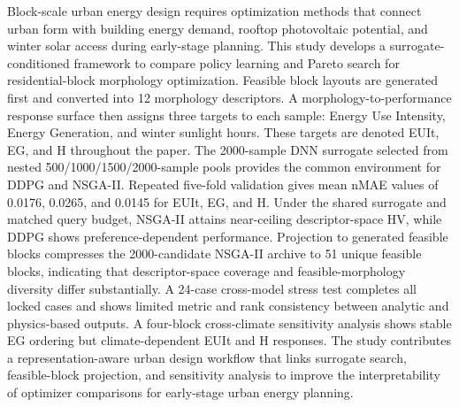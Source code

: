 \documentclass[10pt]{article}
\begin{document}
\begin{revisionbox}
Block-scale urban energy design requires optimization methods that connect urban form with building energy demand, rooftop photovoltaic potential, and winter solar access during early-stage planning. This study develops a surrogate-conditioned framework to compare policy learning and Pareto search for residential-block morphology optimization. Feasible block layouts are generated first and converted into 12 morphology descriptors. A morphology-to-performance response surface then assigns three targets to each sample: Energy Use Intensity, Energy Generation, and winter sunlight hours. These targets are denoted EUIt, EG, and H throughout the paper. The 2000-sample DNN surrogate selected from nested 500/1000/1500/2000-sample pools provides the common environment for DDPG and NSGA-II. Repeated five-fold validation gives mean nMAE values of 0.0176, 0.0265, and 0.0145 for EUIt, EG, and H. Under the shared surrogate and matched query budget, NSGA-II attains near-ceiling descriptor-space HV, while DDPG shows preference-dependent performance. Projection to generated feasible blocks compresses the 2000-candidate NSGA-II archive to 51 unique feasible blocks, indicating that descriptor-space coverage and feasible-morphology diversity differ substantially. A 24-case cross-model stress test completes all locked cases and shows limited metric and rank consistency between analytic and physics-based outputs. A four-block cross-climate sensitivity analysis shows stable EG ordering but climate-dependent EUIt and H responses. The study contributes a representation-aware urban design workflow that links surrogate search, feasible-block projection, and sensitivity analysis to improve the interpretability of optimizer comparisons for early-stage urban energy planning.
\end{revisionbox}
\end{document}
